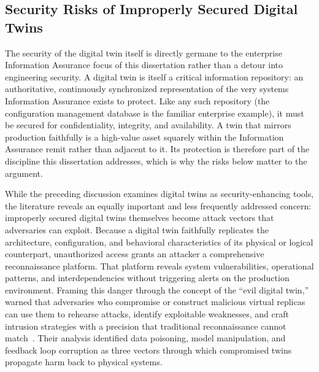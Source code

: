 \subsection{Security Risks of Improperly Secured Digital Twins}

The security of the digital twin itself is directly germane to the enterprise Information Assurance focus of this dissertation rather than a detour into engineering security. A digital twin is itself a critical information repository: an authoritative, continuously synchronized representation of the very systems Information Assurance exists to protect. Like any such repository (the configuration management database is the familiar enterprise example), it must be secured for confidentiality, integrity, and availability. A twin that mirrors production faithfully is a high-value asset squarely within the Information Assurance remit rather than adjacent to it. Its protection is therefore part of the discipline this dissertation addresses, which is why the risks below matter to the argument.

While the preceding discussion examines digital twins as security-enhancing tools, the literature reveals an equally important and less frequently addressed concern: improperly secured digital twins themselves become attack vectors that adversaries can exploit. Because a digital twin faithfully replicates the architecture, configuration, and behavioral characteristics of its physical or logical counterpart, unauthorized access grants an attacker a comprehensive reconnaissance platform. That platform reveals system vulnerabilities, operational patterns, and interdependencies without triggering alerts on the production environment. Framing this danger through the concept of the ``evil digital twin,'' \citeauthor{Suhail_Iqbal_Jurdak_2024} warned that adversaries who compromise or construct malicious virtual replicas can use them to rehearse attacks, identify exploitable weaknesses, and craft intrusion strategies with a precision that traditional reconnaissance cannot match~\parencite{Suhail_Iqbal_Jurdak_2024}. Their analysis identified data poisoning, model manipulation, and feedback loop corruption as three vectors through which compromised twins propagate harm back to physical systems.

